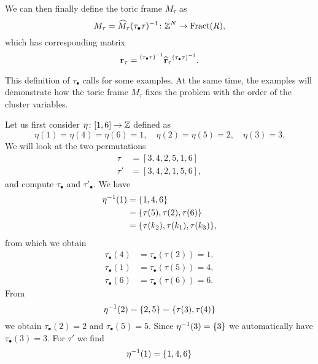 We can then finally define the toric frame $M_\tau$ as
\begin{equation*}
	M_\tau = \widehat{M}_\tau (\tau_\bullet \tau)^{-1} \colon \mathbb{Z}^N \to \operatorname{Fract}(R),
\end{equation*}
which has corresponding matrix
\begin{equation*}
	\mathbf{r}_\tau = \prescript{(\tau_\bullet \tau)^{-1}}{}{ \widehat{\mathbf{r}}_\tau} ^{(\tau_\bullet \tau)^{-1}}.
\end{equation*}

This definition of $\tau_\bullet$ calls for some examples. At the same time, the
examples will demonstrate how the toric frame $M_\tau$ fixes the problem with the order
of the cluster variables.

\begin{example}
	Let us first consider $\eta \colon [1, 6] \to \mathbb{Z}$ defined as
	\begin{equation*}
		\eta(1) = \eta(4) = \eta(6) = 1, \quad \eta(2) = \eta(5) = 2, \quad \eta(3) = 3.
	\end{equation*}
	We will look at the two permutations
	\begin{align*}
		\tau  & = [3,4,2,5,1,6]  \\
		\tau' & = [3,4,2,1,5,6],
	\end{align*}
	and compute $\tau_\bullet$ and $\tau'_\bullet$. We have
	\begin{align*}
		\eta^{-1}(1) & = \{1, 4, 6\}                          \\
		            & = \{\tau(5), \tau(2), \tau(6)\}        \\
		            & = \{\tau(k_2), \tau(k_1), \tau(k_3)\},
	\end{align*}
	from which we obtain
	\begin{align*}
		\tau_\bullet(4) & = \tau_\bullet(\tau(2)) = 1, \\
		\tau_\bullet(1) & = \tau_\bullet(\tau(5)) = 4, \\
		\tau_\bullet(6) & = \tau_\bullet(\tau(6)) = 6.
	\end{align*}
	From
	\begin{equation*}
		\eta^{-1}(2) = \{2, 5\} = \{\tau(3), \tau(4)\}
	\end{equation*}
	we obtain $\tau_\bullet(2) = 2$ and $\tau_\bullet(5) = 5$. Since $\eta^{-1}(3) = \{3\}$
	we automatically have $\tau_\bullet(3) = 3$. For $\tau'$ we find
	\begin{align*}
		\eta\inv(1) & = \{1, 4, 6\}                             \\

\end{align*}
\end{example}
